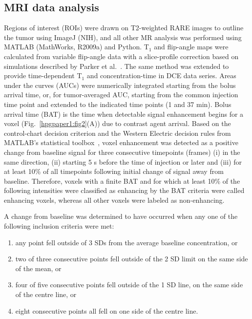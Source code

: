 \subsection{MRI data analysis}

Regions of interest (ROIs) were drawn on T2-weighted RARE images to outline the tumor using ImageJ (NIH), and all other MR analysis was performed using MATLAB (MathWorks, R2009a) and Python.
T$_1$ and flip-angle maps were calculated from variable flip-angle data with a slice-profile correction based on simulations described by Parker et al.~\cite{Parker:2001wj}.
The same method was extended to provide time-dependent T$_1$ and concentration-time in DCE data series.
Areas under the curves (AUCs) were numerically integrated starting from the bolus arrival time, or, for tumor-averaged AUC, starting from the common injection time point and extended to the indicated time points (1 and 37 min).
Bolus arrival time (BAT) is the time when detectable signal enhancement begins for a voxel (Fig.~\ref{hpgpaper1:fig2}(A)) due to contrast agent arrival.
Based on the control-chart decision criterion and the Western Electric decision rules from MATLAB’s statistical toolbox~\cite{Shewhart:1931tq}, voxel enhancement was detected as a positive change from baseline signal for three consecutive timepoints (frames) (i) in the same direction, (ii) starting 5 s before the time of injection or later and (iii) for at least 10\% of all timepoints following initial change of signal away from baseline.
Therefore, voxels with a finite BAT and for which at least 10\% of the following intensities were classified as enhancing by the BAT criteria were called enhancing voxels, whereas all other voxels were labeled as non-enhancing.

A change from baseline was determined to have occurred
when any one of the following inclusion criteria were met:

\begin{enumerate}
	\item any point fell outside of 3 SDs from the average baseline concentration, or
	\item two of three consecutive points fell outside of the 2 SD limit on the same side of the mean, or
	\item four of five consecutive points fell outside of the 1 SD line, on the same side of the centre line, or
	\item eight consecutive points all fell on one side of the centre line.
\end{enumerate}

